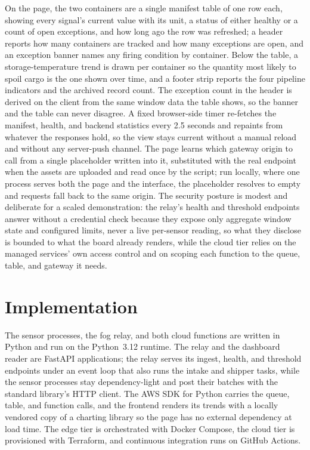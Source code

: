 \documentclass[conference]{IEEEtran}
\begin{document}
On the page, the two containers are a single manifest table of one row each, showing every signal's current value with its unit, a status of either healthy or a count of open exceptions, and how long ago the row was refreshed; a header reports how many containers are tracked and how many exceptions are open, and an exception banner names any firing condition by container. Below the table, a storage-temperature trend is drawn per container so the quantity most likely to spoil cargo is the one shown over time, and a footer strip reports the four pipeline indicators and the archived record count. The exception count in the header is derived on the client from the same window data the table shows, so the banner and the table can never disagree. A fixed browser-side timer re-fetches the manifest, health, and backend statistics every 2.5 seconds and repaints from whatever the responses hold, so the view stays current without a manual reload and without any server-push channel. The page learns which gateway origin to call from a single placeholder written into it, substituted with the real endpoint when the assets are uploaded and read once by the script; run locally, where one process serves both the page and the interface, the placeholder resolves to empty and requests fall back to the same origin. The security posture is modest and deliberate for a scaled demonstration: the relay's health and threshold endpoints answer without a credential check because they expose only aggregate window state and configured limits, never a live per-sensor reading, so what they disclose is bounded to what the board already renders, while the cloud tier relies on the managed services' own access control and on scoping each function to the queue, table, and gateway it needs.

\section{Implementation}

The sensor processes, the fog relay, and both cloud functions are written in Python and run on the Python~3.12 runtime. The relay and the dashboard reader are FastAPI applications; the relay serves its ingest, health, and threshold endpoints under an event loop that also runs the intake and shipper tasks, while the sensor processes stay dependency-light and post their batches with the standard library's HTTP client. The AWS SDK for Python carries the queue, table, and function calls, and the frontend renders its trends with a locally vendored copy of a charting library so the page has no external dependency at load time. The edge tier is orchestrated with Docker Compose, the cloud tier is provisioned with Terraform, and continuous integration runs on GitHub Actions.
\end{document}
